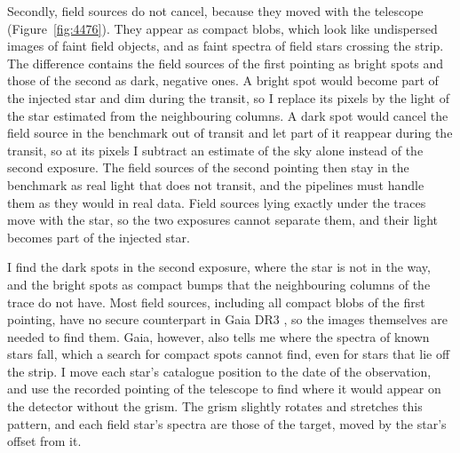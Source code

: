 Secondly, field sources do not cancel, because they moved with the telescope
(Figure~\ref{fig:4476}). They appear as compact blobs, which look like
undispersed images of faint field objects, and as faint spectra of field
stars crossing the strip. The difference contains the field sources of the
first pointing as bright spots and those of the second as dark, negative ones.
A bright spot would become part of the injected star and dim during the
transit, so I replace its pixels by the light of the star estimated from the
neighbouring columns. A dark spot would cancel the field source in the
benchmark out of transit and let part of it reappear during the transit, so
at its pixels I subtract an estimate of the sky alone instead of the second
exposure. The field sources of the second pointing then stay in the benchmark
as real light that does not transit, and the pipelines must handle them as
they would in real data. Field sources lying exactly under the traces move
with the star, so the two exposures cannot separate them, and their light
becomes part of the injected star.

I find the dark spots in the second exposure, where the star is not in the
way, and the bright spots as compact bumps that the neighbouring columns of
the trace do not have. Most field sources, including all compact blobs of the
first pointing, have no secure counterpart in Gaia DR3 \citep{GaiaDR3}, so the
images themselves are needed to find them. Gaia, however, also tells me where
the spectra of known stars fall, which a search for compact spots cannot
find, even for stars that lie off the strip. I move each star's catalogue
position to the date of the observation, and use the recorded pointing of the
telescope to find where it would appear on the detector without the grism.
The grism slightly rotates and stretches this pattern, and each field star's
spectra are those of the target, moved by the star's offset from it.


